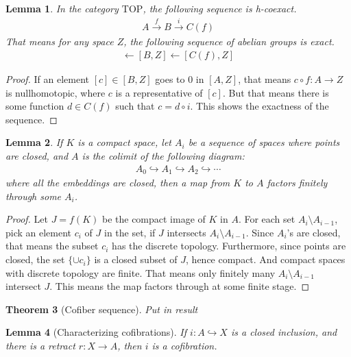 \documentclass[12pt, notitlepage]{article}
\newtheorem{thm}{Theorem}[section]
\newtheorem{lem}[thm]{Lemma}
\theoremstyle{definition}
\newcommand{\cat}[1]{\mathrm{#1}}
\begin{document}
\begin{lem}
  In the category $\cat{TOP}$, the following sequence is h-coexact.
  \begin{align*}
    A \xrightarrow{f} B \xrightarrow{i} C(f)
  \end{align*}
  That means for any space $Z$, the following sequence of abelian groups is exact.
  \begin{align*}
    [A, Z] \leftarrow [B,Z] \leftarrow [C(f), Z]
  \end{align*}
\end{lem}

\begin{proof}
  If an element $[c] \in [B,Z]$ goes to $0$ in $[A, Z]$, that means $c \circ f: A \to Z$ is
  nullhomotopic, where $c$ is a representative of $[c]$. But that means there is some function
  $d \in C(f)$ such that $c = d \circ i$. This shows the exactness of the sequence.
\end{proof}

\begin{lem}
  If $K$ is a compact space, let $A_i$ be a sequence of spaces where points are closed, and $A$ is
  the colimit of the following diagram:
  \begin{align*}
    A_0 \hookrightarrow A_1 \hookrightarrow A_2 \hookrightarrow \cdots
  \end{align*}
  where all the embeddings are closed, then a map from $K$ to $A$ factors finitely through some
  $A_i$.
\end{lem}

\begin{proof}
  Let $J = f(K)$ be the compact image of $K$ in $A$. For each set $A_i \setminus A_{i-1}$, pick an
  element $c_i$ of $J$ in the set, if $J$ intersects $A_i \setminus A_{i-1}$. Since $A_i$'s are
  closed, that means the subset $c_i$ has the discrete topology. Furthermore, since points are
  closed, the set $\{\cup c_i\}$ is a closed subset of $J$, hence compact. And compact spaces with
  discrete topology are finite. That means only finitely many $A_i \setminus A_{i-1}$ intersect $J$.
  This means the map factors through at some finite stage.
\end{proof}

\begin{thm}[Cofiber sequence]
  Put in result
\end{thm}

\begin{lem}[Characterizing cofibrations]
  If $i: A \hookrightarrow X$ is a closed inclusion, and there is a retract $r: X \to A$, then $i$
  is a cofibration.
\end{lem}
\end{document}
